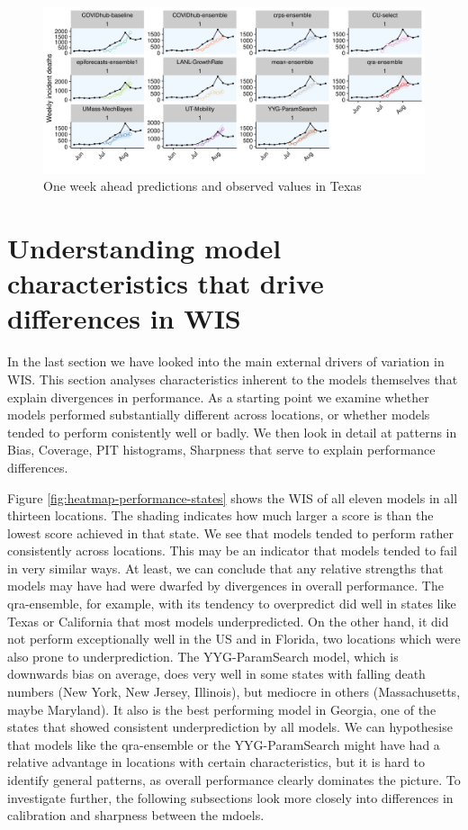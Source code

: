 \documentclass[
]{book}
\begin{document}
\begin{figure}
\includegraphics[width=1\linewidth]{../visualisation/chapter-5-results/scenario-baseline/Texas-one-week} \caption{One week ahead predictions and observed values in Texas}\label{fig:pred-texas}
\end{figure}

\hypertarget{model-characteristics}{%
\section{Understanding model characteristics that drive differences in WIS}\label{model-characteristics}}

In the last section we have looked into the main external drivers of variation in WIS. This section analyses characteristics inherent to the models themselves that explain divergences in performance. As a starting point we examine whether models performed substantially different across locations, or whether models tended to perform conistently well or badly. We then look in detail at patterns in Bias, Coverage, PIT histograms, Sharpness that serve to explain performance differences.

Figure \ref{fig:heatmap-performance-states} shows the WIS of all eleven models in all thirteen locations. The shading indicates how much larger a score is than the lowest score achieved in that state. We see that models tended to perform rather consistently across locations. This may be an indicator that models tended to fail in very similar ways. At least, we can conclude that any relative strengths that models may have had were dwarfed by divergences in overall performance. The qra-ensemble, for example, with its tendency to overpredict did well in states like Texas or California that most models underpredicted. On the other hand, it did not perform exceptionally well in the US and in Florida, two locations which were also prone to underprediction. The YYG-ParamSearch model, which is downwards bias on average, does very well in some states with falling death numbers (New York, New Jersey, Illinois), but mediocre in others (Massachusetts, maybe Maryland). It also is the best performing model in Georgia, one of the states that showed consistent underprediction by all models. We can hypothesise that models like the qra-ensemble or the YYG-ParamSearch might have had a relative advantage in locations with certain characteristics, but it is hard to identify general patterns, as overall performance clearly dominates the picture. To investigate further, the following subsections look more closely into differences in calibration and sharpness between the mdoels.
\end{document}

